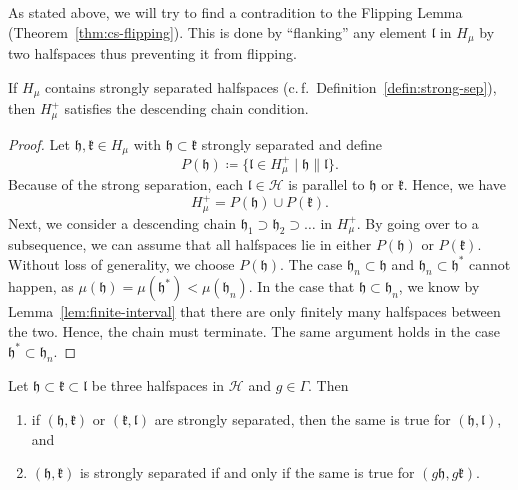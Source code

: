 As stated above, we will try to find a contradition to the Flipping Lemma (Theorem~\ref{thm:cs-flipping}). This is done by \enquote{flanking} any element \(\mathfrak{l}\) in \(H_\mu\) by two halfspaces thus preventing it from flipping.

\begin{lemma}[{\cite[Lemma~4.18]{MR3509968}}]
  \label{lem:4.18}
  If \(H_\mu\) contains strongly separated halfspaces (c.\,f.~Definition~\ref{defin:strong-sep}), then \(H_\mu^+\) satisfies the descending chain condition.
\end{lemma}

\begin{proof}
  Let \(\mathfrak{h, k} \in H_\mu\) with \(\mathfrak{h} \subset \mathfrak{k}\) strongly separated and define
  \[
    P(\mathfrak{h}) \coloneqq \{\mathfrak{l} \in H_\mu^+ \mid \mathfrak{h} \parallel \mathfrak{l}\}.
  \]
  Because of the strong separation, each \(\mathfrak{l} \in \mathcal{H}\) is parallel to \(\mathfrak{h}\) or \(\mathfrak{k}\). Hence, we have
  \[
    H_\mu^+ = P(\mathfrak{h}) \cup P(\mathfrak{k}).
  \]
  Next, we consider a descending chain \(\mathfrak{h_1} \supset \mathfrak{h_2} \supset \dots\) in \(H_\mu^+\). By going over to a subsequence, we can assume that all halfspaces lie in either \(P(\mathfrak{h})\) or \(P(\mathfrak{k})\). Without loss of generality, we choose \(P(\mathfrak{h})\). The case \(\mathfrak{h}_n \subset \mathfrak{h}\) and \(\mathfrak{h}_n \subset \mathfrak{h}^\ast\) cannot happen, as \(\mu(\mathfrak{h}) = \mu(\mathfrak{h}^\ast) < \mu(\mathfrak{h}_n)\). In the case that \(\mathfrak{h} \subset \mathfrak{h}_n\), we know by Lemma~\ref{lem:finite-interval} that there are only finitely many halfspaces between the two. Hence, the chain must terminate. The same argument holds in the case \(\mathfrak{h}^\ast \subset \mathfrak{h}_n\).
\end{proof}


\begin{lemma}
  \label{lem:strongly-sep}
  Let \(\mathfrak{h} \subset \mathfrak{k} \subset \mathfrak{l}\) be three halfspaces in \(\mathcal{H}\) and \(g \in \Gamma\). Then
  \begin{enumerate}
  \item if \((\mathfrak{h}, \mathfrak{k})\) or \((\mathfrak{k}, \mathfrak{l})\) are strongly separated, then the same is true for \((\mathfrak{h}, \mathfrak{l})\), and
  \item \((\mathfrak{h}, \mathfrak{k})\) is strongly separated if and only if the same is true for \((g\mathfrak{h}, g\mathfrak{k})\).
  \end{enumerate}
\end{lemma}

